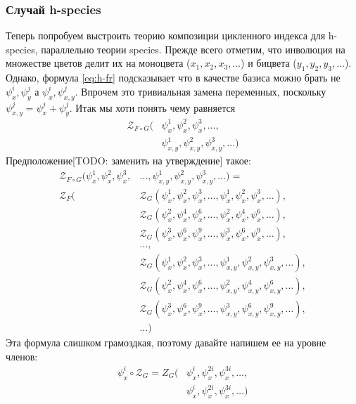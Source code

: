 \subsubsection{Случай h-species}
Теперь попробуем выстроить теорию композиции цикленного индекса для h-species,
параллельно теории species. Прежде всего отметим, что инволюция на множестве
цветов делит их на моноцвета ($x_1, x_2, x_3, \dots$) и бицвета ($y_1, y_2,
y_3, \dots$). Однако, формула \ref{eq:h-fr} подсказывает что в качестве базиса
можно брать не $\psi_x^i, \psi_y^j$ а $\psi_x^i, \psi_{x,y}^j$. Впрочем это
тривиальная замена переменных, поскольку $\psi_{x,y}^j = \psi_x^j + \psi_y^j$.
Итак мы хоти понять чему равняется
\begin{equation*}
\begin{split}
\mathcal Z_{F \circ G} (&\psi_x^1, \psi_x^2, \psi_x^3, \dots, \\
						&\psi_{x,y}^1, \psi_{x,y}^2, \psi_{x,y}^3, \dots)
\end{split}
\end{equation*}
Предположение[TODO: заменить на утверждение] такое:
\begin{equation}
\begin{split}
\label{eq:h-zfg}
	\mathcal Z_{F \circ G} (\psi_x^1, \psi_x^2, \psi_x^3, &\dots, 
	\psi_{x,y}^1, \psi_{x,y}^2, \psi_{x,y}^3, \dots) = \\
	\mathcal Z_F(
		&\mathcal Z_G(\psi_x^1, \psi_x^2, \psi_x^3, \dots, 
					 \psi_x^1, \psi_x^2, \psi_x^3, \dots), \\
		&\mathcal Z_G(\psi_x^2, \psi_x^4, \psi_x^6, \dots, 
					 \psi_x^2, \psi_x^4, \psi_x^6, \dots), \\
		&\mathcal Z_G(\psi_x^3, \psi_x^6, \psi_x^9, \dots, 
					 \psi_x^3, \psi_x^6, \psi_x^9, \dots), \\
		&\dots, \\
		&\mathcal Z_G(\psi_x^1, \psi_x^2, \psi_x^3, \dots, 
					 \psi_{x,y}^1, \psi_{x,y}^2, \psi_{x,y}^3, \dots), \\
		&\mathcal Z_G(\psi_x^2, \psi_x^4, \psi_x^6, \dots, 
					 \psi_{x,y}^2, \psi_{x,y}^4, \psi_{x,y}^6, \dots), \\
		&\mathcal Z_G(\psi_x^3, \psi_x^6, \psi_x^9, \dots, 
					 \psi_{x,y}^3, \psi_{x,y}^6, \psi_{x,y}^9, \dots), \\
		&\dots
	)
\end{split}	
\end{equation}
Эта формула слишком грамоздкая, поэтому давайте напишем ее на уровне членов:
\begin{equation*}
\begin{split}
\psi_x^i \circ \mathcal Z_G = Z_G(&\psi_x^i, \psi_x^{2i}, \psi_x^{3i}, \dots, \\ 
					 			  &\psi_x^i, \psi_x^{2i}, \psi_x^{3i}, \dots)
\end{split}
\end{equation*}
